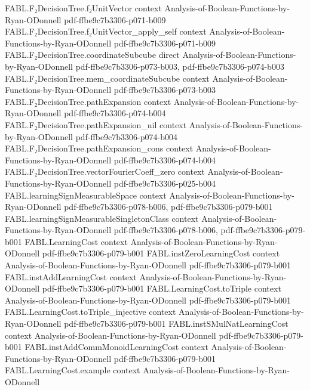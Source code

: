 \begin{theorem}
  {FABL.F₂DecisionTree.f₂UnitVector}
  {context}
  {Analysis-of-Boolean-Functions-by-Ryan-ODonnell}
  {pdf-ffbe9c7b3306-p071-b009}
\proofstep
  {FABL.F₂DecisionTree.f₂UnitVector_apply_self}
  {context}
  {Analysis-of-Boolean-Functions-by-Ryan-ODonnell}
  {pdf-ffbe9c7b3306-p071-b009}
\proofstep
  {FABL.F₂DecisionTree.coordinateSubcube}
  {direct}
  {Analysis-of-Boolean-Functions-by-Ryan-ODonnell}
  {pdf-ffbe9c7b3306-p073-b003,
    pdf-ffbe9c7b3306-p074-b003}
\proofstep
  {FABL.F₂DecisionTree.mem_coordinateSubcube}
  {context}
  {Analysis-of-Boolean-Functions-by-Ryan-ODonnell}
  {pdf-ffbe9c7b3306-p073-b003}
\proofstep
  {FABL.F₂DecisionTree.pathExpansion}
  {context}
  {Analysis-of-Boolean-Functions-by-Ryan-ODonnell}
  {pdf-ffbe9c7b3306-p074-b004}
\proofstep
  {FABL.F₂DecisionTree.pathExpansion_nil}
  {context}
  {Analysis-of-Boolean-Functions-by-Ryan-ODonnell}
  {pdf-ffbe9c7b3306-p074-b004}
\proofstep
  {FABL.F₂DecisionTree.pathExpansion_cons}
  {context}
  {Analysis-of-Boolean-Functions-by-Ryan-ODonnell}
  {pdf-ffbe9c7b3306-p074-b004}
\proofstep
  {FABL.F₂DecisionTree.vectorFourierCoeff_zero}
  {context}
  {Analysis-of-Boolean-Functions-by-Ryan-ODonnell}
  {pdf-ffbe9c7b3306-p025-b004}
\proofstep
  {FABL.learningSignMeasurableSpace}
  {context}
  {Analysis-of-Boolean-Functions-by-Ryan-ODonnell}
  {pdf-ffbe9c7b3306-p078-b006,
    pdf-ffbe9c7b3306-p079-b001}
\proofstep
  {FABL.learningSignMeasurableSingletonClass}
  {context}
  {Analysis-of-Boolean-Functions-by-Ryan-ODonnell}
  {pdf-ffbe9c7b3306-p078-b006,
    pdf-ffbe9c7b3306-p079-b001}
\proofstep
  {FABL.LearningCost}
  {context}
  {Analysis-of-Boolean-Functions-by-Ryan-ODonnell}
  {pdf-ffbe9c7b3306-p079-b001}
\proofstep
  {FABL.instZeroLearningCost}
  {context}
  {Analysis-of-Boolean-Functions-by-Ryan-ODonnell}
  {pdf-ffbe9c7b3306-p079-b001}
\proofstep
  {FABL.instAddLearningCost}
  {context}
  {Analysis-of-Boolean-Functions-by-Ryan-ODonnell}
  {pdf-ffbe9c7b3306-p079-b001}
\proofstep
  {FABL.LearningCost.toTriple}
  {context}
  {Analysis-of-Boolean-Functions-by-Ryan-ODonnell}
  {pdf-ffbe9c7b3306-p079-b001}
\proofstep
  {FABL.LearningCost.toTriple_injective}
  {context}
  {Analysis-of-Boolean-Functions-by-Ryan-ODonnell}
  {pdf-ffbe9c7b3306-p079-b001}
\proofstep
  {FABL.instSMulNatLearningCost}
  {context}
  {Analysis-of-Boolean-Functions-by-Ryan-ODonnell}
  {pdf-ffbe9c7b3306-p079-b001}
\proofstep
  {FABL.instAddCommMonoidLearningCost}
  {context}
  {Analysis-of-Boolean-Functions-by-Ryan-ODonnell}
  {pdf-ffbe9c7b3306-p079-b001}
\proofstep
  {FABL.LearningCost.example}
  {context}
  {Analysis-of-Boolean-Functions-by-Ryan-ODonnell}

\end{theorem}

